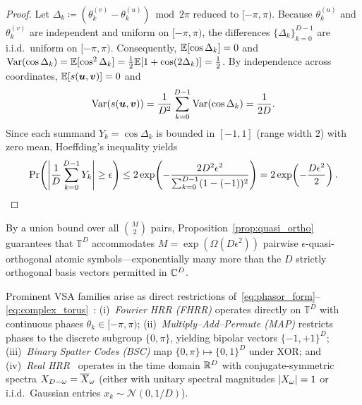 \begin{proof}
Let $\Delta_k \coloneqq \left(\theta_k^{(v)} - \theta_k^{(u)}\right) \bmod 2\pi$ reduced to $[-\pi, \pi)$.
Because $\theta_k^{(u)}$ and $\theta_k^{(v)}$ are independent and uniform on $[-\pi, \pi)$, the differences $\{\Delta_k\}_{k=0}^{D-1}$ are i.i.d.\ uniform on $[-\pi, \pi)$.
Consequently, $\mathbb{E}[\cos\Delta_k] = 0$ and $\operatorname{Var}(\cos\Delta_k) = \mathbb{E}[\cos^2\Delta_k] = \frac{1}{2}\mathbb{E}[1 + \cos(2\Delta_k)] = \frac{1}{2}$.
By independence across coordinates, $\mathbb{E}[s(\boldsymbol{u}, \boldsymbol{v})] = 0$ and
\begin{equation*}
    \operatorname{Var}\!\left(s(\boldsymbol{u}, \boldsymbol{v})\right)
    = \frac{1}{D^2} \sum_{k=0}^{D-1} \operatorname{Var}(\cos\Delta_k)
    = \frac{1}{2D}.
\end{equation*}
Since each summand $Y_k = \cos\Delta_k$ is bounded in $[-1, 1]$ (range width $2$) with zero mean, Hoeffding's inequality yields
\begin{equation*}
    \Pr\!\left(\left\lvert \frac{1}{D}\sum_{k=0}^{D-1} Y_k \right\rvert \ge \epsilon\right)
    \le 2 \exp\!\left(-\frac{2 D^2 \epsilon^2}{\sum_{k=0}^{D-1} (1 - (-1))^2}\right)
    = 2 \exp\!\left(-\frac{D\epsilon^2}{2}\right). \qedhere
\end{equation*}
\end{proof}

By a union bound over all $\binom{M}{2}$ pairs, Proposition~\ref{prop:quasi_ortho} guarantees that $\mathbb{T}^D$ accommodates $M = \exp(\Omega(D\epsilon^2))$ pairwise $\epsilon$-quasi-orthogonal atomic symbols---exponentially many more than the $D$ strictly orthogonal basis vectors permitted in $\mathbb{C}^D$.

\begin{remark}\label{rem:specializations}
Prominent VSA families arise as direct restrictions of~\eqref{eq:phasor_form}--\eqref{eq:complex_torus}~\cite{SCHLEGEL_VSA_COMPARISON}:
(i)~\emph{Fourier HRR (FHRR)} operates directly on $\mathbb{T}^D$ with continuous phases $\theta_k \in [-\pi, \pi)$;
(ii)~\emph{Multiply--Add--Permute (MAP)} restricts phases to the discrete subgroup $\{0, \pi\}$, yielding bipolar vectors $\{-1, +1\}^D$;
(iii)~\emph{Binary Spatter Codes (BSC)} map $\{0, \pi\} \mapsto \{0, 1\}^D$ under XOR; and
(iv)~\emph{Real HRR}~\cite{PLATE_1995_HRR} operates in the time domain $\mathbb{R}^D$ with conjugate-symmetric spectra $X_{D-\omega} = \overline{X}_\omega$ (either with unitary spectral magnitudes $\left\lvert X_\omega \right\rvert=1$ or i.i.d.\ Gaussian entries $x_k \sim \mathcal{N}(0, 1/D)$).
\end{remark}

